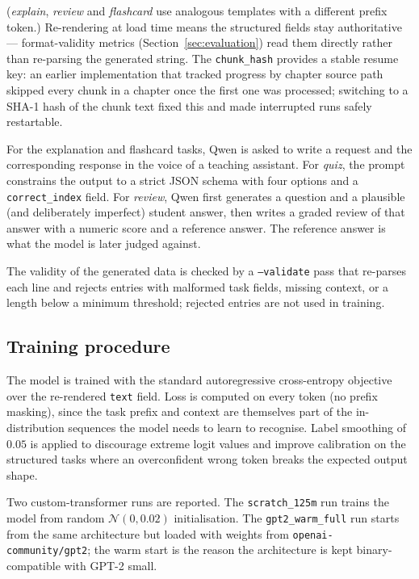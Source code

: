 (\emph{explain}, \emph{review} and \emph{flashcard} use analogous templates with a different
prefix token.) Re-rendering at load time means the structured fields stay authoritative ---
format-validity metrics (Section~\ref{sec:evaluation}) read them directly rather than
re-parsing the generated string. The \texttt{chunk\_hash} provides a stable resume key:
an earlier implementation that tracked progress by chapter source path skipped every chunk
in a chapter once the first one was processed; switching to a SHA-1 hash of the chunk text
fixed this and made interrupted runs safely restartable.

For the explanation and flashcard tasks, Qwen is asked to write a request and the
corresponding response in the voice of a teaching assistant. For \emph{quiz}, the prompt
constrains the output to a strict JSON schema with four options and a \texttt{correct\_index}
field. For \emph{review}, Qwen first generates a question and a plausible (and deliberately
imperfect) student answer, then writes a graded review of that answer with a numeric score
and a reference answer. The reference answer is what the model is later judged against.

The validity of the generated data is checked by a \texttt{--validate} pass that re-parses
each line and rejects entries with malformed task fields, missing context, or a length below
a minimum threshold; rejected entries are not used in training.

\subsection{Training procedure}

The model is trained with the standard autoregressive cross-entropy objective over the
re-rendered \texttt{text} field. Loss is computed on every token (no prefix masking), since
the task prefix and context are themselves part of the in-distribution sequences the model
needs to learn to recognise. Label smoothing of $0.05$ is applied to discourage extreme
logit values and improve calibration on the structured tasks where an overconfident wrong
token breaks the expected output shape.

Two custom-transformer runs are reported. The \texttt{scratch\_125m} run trains the model
from random $\mathcal{N}(0, 0.02)$ initialisation. The \texttt{gpt2\_warm\_full} run starts
from the same architecture but loaded with weights from \texttt{openai-community/gpt2}; the
warm start is the reason the architecture is kept binary-compatible with GPT-2 small.

